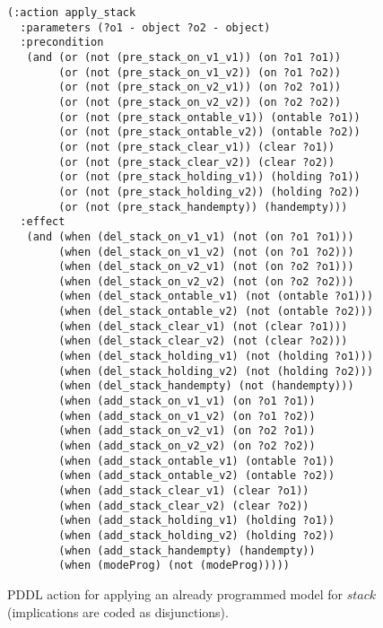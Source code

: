 \begin{itemize}
\begin{enumerate}
\begin{figure}[hbt!]
\begin{center}
\begin{scriptsize}
\begin{verbatim}
(:action apply_stack
  :parameters (?o1 - object ?o2 - object)
  :precondition
   (and (or (not (pre_stack_on_v1_v1)) (on ?o1 ?o1))
        (or (not (pre_stack_on_v1_v2)) (on ?o1 ?o2))
        (or (not (pre_stack_on_v2_v1)) (on ?o2 ?o1))
        (or (not (pre_stack_on_v2_v2)) (on ?o2 ?o2))
        (or (not (pre_stack_ontable_v1)) (ontable ?o1))
        (or (not (pre_stack_ontable_v2)) (ontable ?o2))
        (or (not (pre_stack_clear_v1)) (clear ?o1))
        (or (not (pre_stack_clear_v2)) (clear ?o2))
        (or (not (pre_stack_holding_v1)) (holding ?o1))
        (or (not (pre_stack_holding_v2)) (holding ?o2))
        (or (not (pre_stack_handempty)) (handempty)))
  :effect
   (and (when (del_stack_on_v1_v1) (not (on ?o1 ?o1)))
        (when (del_stack_on_v1_v2) (not (on ?o1 ?o2)))
        (when (del_stack_on_v2_v1) (not (on ?o2 ?o1)))
        (when (del_stack_on_v2_v2) (not (on ?o2 ?o2)))
        (when (del_stack_ontable_v1) (not (ontable ?o1)))
        (when (del_stack_ontable_v2) (not (ontable ?o2)))
        (when (del_stack_clear_v1) (not (clear ?o1)))
        (when (del_stack_clear_v2) (not (clear ?o2)))
        (when (del_stack_holding_v1) (not (holding ?o1)))
        (when (del_stack_holding_v2) (not (holding ?o2)))
        (when (del_stack_handempty) (not (handempty)))
        (when (add_stack_on_v1_v1) (on ?o1 ?o1))
        (when (add_stack_on_v1_v2) (on ?o1 ?o2))
        (when (add_stack_on_v2_v1) (on ?o2 ?o1))
        (when (add_stack_on_v2_v2) (on ?o2 ?o2))
        (when (add_stack_ontable_v1) (ontable ?o1))
        (when (add_stack_ontable_v2) (ontable ?o2))
        (when (add_stack_clear_v1) (clear ?o1))
        (when (add_stack_clear_v2) (clear ?o2))
        (when (add_stack_holding_v1) (holding ?o1))
        (when (add_stack_holding_v2) (holding ?o2))
        (when (add_stack_handempty) (handempty))
        (when (modeProg) (not (modeProg)))))
\end{verbatim}
\end{scriptsize}
 \caption{\small PDDL action for applying an already programmed model for $stack$ (implications are coded as disjunctions).}
\label{fig:compilation}
\end{center}
\end{figure}

\vspace{0.1cm}


\end{enumerate}
\end{itemize}
